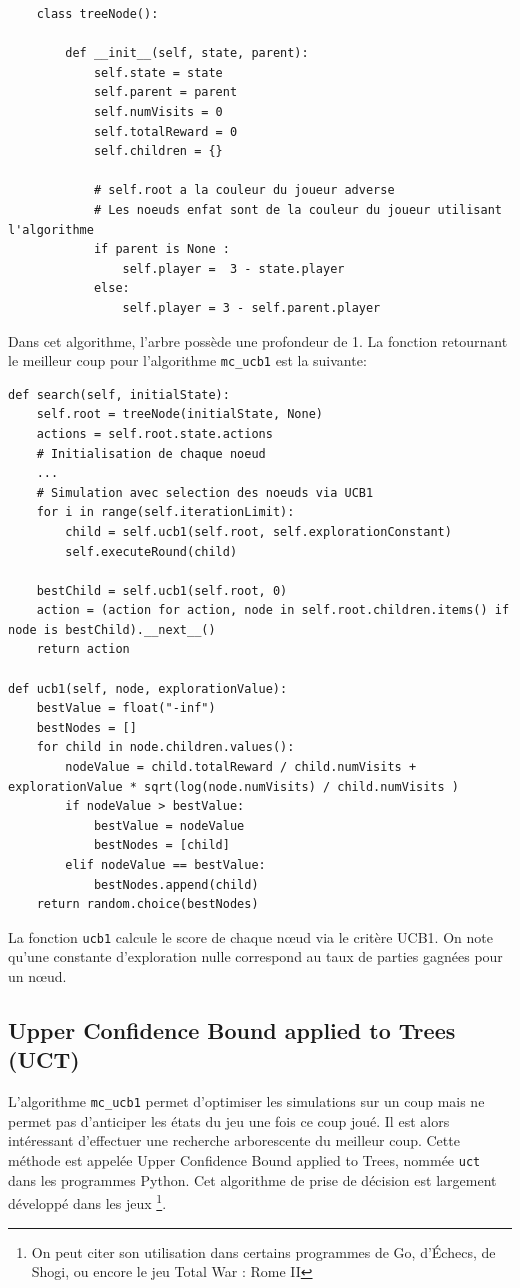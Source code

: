 \documentclass[a4paper]{article}
\theoremstyle{definition}
\begin{document}
\begin{lstlisting}
	class treeNode():
	
		def __init__(self, state, parent):
			self.state = state
			self.parent = parent
			self.numVisits = 0
			self.totalReward = 0
			self.children = {}
			
			# self.root a la couleur du joueur adverse 
			# Les noeuds enfat sont de la couleur du joueur utilisant l'algorithme
			if parent is None : 
				self.player =  3 - state.player
			else:
				self.player = 3 - self.parent.player
\end{lstlisting}

Dans cet algorithme, l'arbre possède une profondeur de 1. La fonction retournant le meilleur coup pour l'algorithme \texttt{mc\_ucb1} est la suivante:

\begin{lstlisting}
def search(self, initialState):
	self.root = treeNode(initialState, None)
	actions = self.root.state.actions
	# Initialisation de chaque noeud
	...
	# Simulation avec selection des noeuds via UCB1
	for i in range(self.iterationLimit):
		child = self.ucb1(self.root, self.explorationConstant)
		self.executeRound(child)
		
	bestChild = self.ucb1(self.root, 0)
	action = (action for action, node in self.root.children.items() if node is bestChild).__next__()
	return action
	
def ucb1(self, node, explorationValue):
	bestValue = float("-inf")
	bestNodes = []
	for child in node.children.values():
		nodeValue = child.totalReward / child.numVisits + explorationValue * sqrt(log(node.numVisits) / child.numVisits )
		if nodeValue > bestValue:
			bestValue = nodeValue
			bestNodes = [child]
		elif nodeValue == bestValue:
			bestNodes.append(child)
	return random.choice(bestNodes)
\end{lstlisting}

La fonction \texttt{ucb1} calcule le score de chaque nœud via le critère UCB1. On note qu'une constante d'exploration nulle correspond au taux de parties gagnées pour un nœud.

\subsection{Upper Confidence Bound applied to Trees (UCT)}

L'algorithme \texttt{mc\_ucb1} permet d'optimiser les simulations sur un coup mais ne permet pas d'anticiper les états du jeu une fois ce coup joué. Il est alors intéressant d'effectuer une recherche arborescente du meilleur coup. Cette méthode est appelée Upper Confidence Bound applied to Trees, nommée \texttt{uct} dans les programmes Python. Cet algorithme de prise de décision est largement développé dans les jeux \footnote{On peut citer son utilisation dans certains programmes de Go, d'Échecs, de Shogi, ou encore le jeu Total War : Rome II}.
\end{document}
